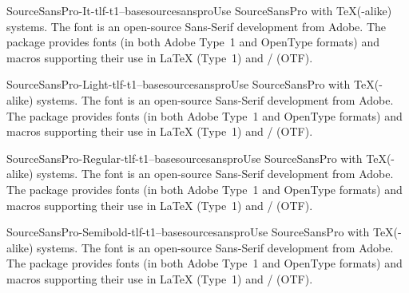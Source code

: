 \documentclass{ddltxtyp}
\begin{document}
\begin{package}{SourceSansPro-It-tlf-t1--base}{sourcesanspro}{Use SourceSansPro with {\TeX}(-alike) systems.}
The font is an open-source Sans-Serif development from Adobe.
The package provides fonts (in both Adobe Type~1 and OpenType
formats) and macros supporting their use in {\LaTeX} (Type~1) and
{\XeLaTeX}/{\LuaLaTeX} (OTF).
\end{package}
\begin{package}{SourceSansPro-Light-tlf-t1--base}{sourcesanspro}{Use SourceSansPro with {\TeX}(-alike) systems.}
The font is an open-source Sans-Serif development from Adobe.
The package provides fonts (in both Adobe Type~1 and OpenType
formats) and macros supporting their use in {\LaTeX} (Type~1) and
{\XeLaTeX}/{\LuaLaTeX} (OTF).
\end{package}
\begin{package}{SourceSansPro-Regular-tlf-t1--base}{sourcesanspro}{Use SourceSansPro with {\TeX}(-alike) systems.}
The font is an open-source Sans-Serif development from Adobe.
The package provides fonts (in both Adobe Type~1 and OpenType
formats) and macros supporting their use in {\LaTeX} (Type~1) and
{\XeLaTeX}/{\LuaLaTeX} (OTF).
\end{package}
\begin{package}{SourceSansPro-Semibold-tlf-t1--base}{sourcesanspro}{Use SourceSansPro with {\TeX}(-alike) systems.}
The font is an open-source Sans-Serif development from Adobe.
The package provides fonts (in both Adobe Type~1 and OpenType
formats) and macros supporting their use in {\LaTeX} (Type~1) and
{\XeLaTeX}/{\LuaLaTeX} (OTF).
\end{package}
\end{document}
